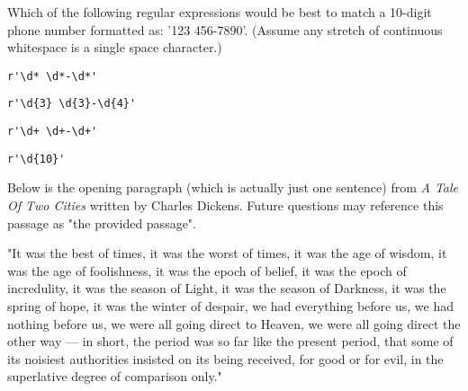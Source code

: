\documentclass[addpoints]{exam}
\begin{document}
\begin{questions}
\begin{minipage}{\textwidth}
\begin{center}
\begin{tabular}{ l c l }
    \end{tabular}
\end{center}

\end{minipage}





\vspace{1cm}

\begin{minipage}{\textwidth}

\question[5]

Which of the following regular expressions would be best to match a 10-digit phone number formatted as: '123 456-7890'. (Assume any stretch of continuous whitespace is a single space character.)

\vspace{0.2cm}

\begin{choices}

\choice

\verb|r'\d* \d*-\d*'|
\choice

\verb|r'\d{3} \d{3}-\d{4}'|
\choice

\verb|r'\d+ \d+-\d+'|
\choice

\verb|r'\d{10}'|

\end{choices}

\end{minipage}





\vspace{1cm}

\begin{minipage}{\textwidth}

\question[0]

Below is the opening paragraph (which is actually just one sentence) from
\textit{A Tale Of Two Cities} written by Charles Dickens.
Future questions may reference this passage as "the provided passage".
 \newline


"It was the best of times, it was the worst of times, it was the age of wisdom, it was the age of foolishness,
it was the epoch of belief, it was the epoch of incredulity, it was the season of Light,
it was the season of Darkness, it was the spring of hope, it was the winter of despair, we had everything before us,
we had nothing before us, we were all going direct to Heaven, we were all going direct the other way
— in short, the period was so far like the present period, that some of its noisiest authorities insisted on its being received,
for good or for evil, in the superlative degree of comparison only."


\end{minipage}
\end{questions}
\end{document}
